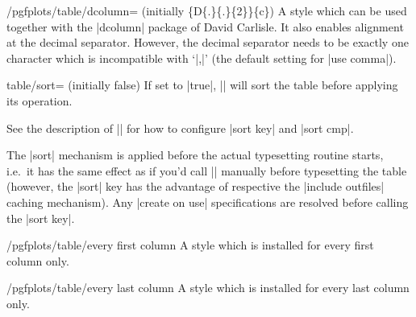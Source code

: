 \begin{stylekey}{/pgfplots/table/dcolumn= (initially \{D\{.\}\{.\}\{2\}\}\{c\})}
	A style which can be used together with the |dcolumn| package of David Carlisle. It also enables alignment at the decimal separator. However, the decimal separator needs to be exactly one character which is incompatible with `|{,}|' (the default setting for |use comma|).
\end{stylekey}

\begin{pgfplotskey}{table/sort= (initially false)}
	If set to |true|, |\pgfplotstabletypeset| will sort the table before applying its operation.

	See the description of |\pgfplotstablesort| for how to configure |sort key| and |sort cmp|.

\begin{codeexample}[]
\end{codeexample}

	The |sort| mechanism is applied before the actual typesetting routine starts, i.e.\ it has the same effect as if you'd call |\pgfplotstablesort| manually before typesetting the table (however, the |sort| key has the advantage of respective the |include outfiles| caching mechanism). Any |create on use| specifications are resolved before calling the |sort key|.


\end{pgfplotskey}

\begin{stylekey}{/pgfplots/table/every first column}
A style which is installed for every first column only.
\begin{codeexample}[narrow]
\end{codeexample}
\end{stylekey}

\begin{stylekey}{/pgfplots/table/every last column}
A style which is installed for every last column only.
\end{stylekey}

